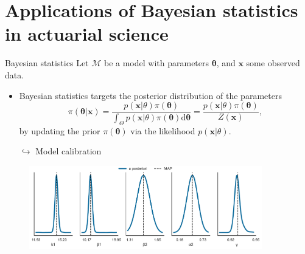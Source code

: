 \documentclass{beamer}
\begin{document}
\section{Applications of Bayesian statistics in actuarial science}
\begin{frame}{Bayesian statistics}
\small
Let $\mathcal{M}$ be a model with parameters $\mathbf{\theta}$, and $\mathbf{x}$ some observed data. 
\begin{itemize}
\item Bayesian statistics targets the posterior distribution of the parameters 
\begin{equation*}
\pi(\mathbf{\theta}|\mathbf{x}) = \frac{p(\mathbf{x}|\theta)\pi(\mathbf{\theta})}{\int_{\Theta}p(\mathbf{x}|\theta)\pi(\mathbf{\theta})\text{d}\mathbf{\theta}} =  \frac{p(\mathbf{x}|\theta)\pi(\mathbf{\theta})}{Z(\mathbf{x})},
\end{equation*}
by updating the prior $\pi(\mathbf{\theta})$ via the likelihood $p(\mathbf{x}|\theta)$.
\item[\tiny$\hookrightarrow$] Model calibration
\end{itemize}
% 
\begin{figure}[!ht]
  \begin{center}
      \includegraphics[width=0.9\textwidth]{../../Figures/posterior_plots_danish_weibull_loglogistic_continuous}
      \label{sub:posterior_plots_danish_weibull_loglogistic_continuous}
  \end{center}
\end{figure}
\end{frame}
\end{document}
